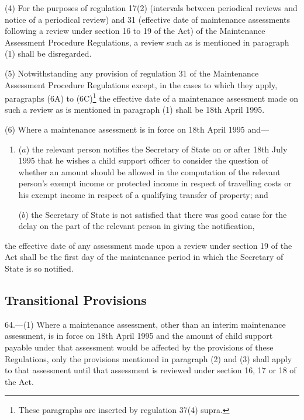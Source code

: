 \documentclass[a4paper]{article}
\begin{document}
(4) For the purposes of regulation 17(2) (intervals between periodical reviews and notice of a periodical review) and 31 (effective date of maintenance assessments following a review under section 16 to 19 of the Act) of the Maintenance Assessment Procedure Regulations, a review such as is mentioned in paragraph (1) shall be disregarded.

(5) Notwithstanding any provision of regulation 31 of the Maintenance Assessment Procedure Regulations except, in the cases to which they apply, paragraphs (6A) to (6C)\footnote{\frenchspacing These paragraphs are inserted by regulation 37(4) supra.} the effective date of a maintenance assessment made on such a review as is mentioned in paragraph (1) shall be 18th April 1995.

(6) Where a maintenance assessment is in force on 18th April 1995 and—
\begin{enumerate}\item[]
($a$) the relevant person notifies the Secretary of State on or after 18th July 1995 that he wishes a child support officer to consider the question of whether an amount should be allowed in the computation of the relevant person’s exempt income or protected income in respect of travelling costs or his exempt income in respect of a qualifying transfer of property; and

($b$) the Secretary of State is not satisfied that there was good cause for the delay on the part of the relevant person in giving the notification,
\end{enumerate}
the effective date of any assessment made upon a review under section 19 of the Act shall be the first day of the maintenance period in which the Secretary of State is so notified.

\subsection[64. Transitional Provisions]{Transitional Provisions}

64.—(1) Where a maintenance assessment, other than an interim maintenance assessment, is in force on 18th April 1995 
and  %
the amount of child support payable under that assessment would be affected by the provisions of these Regulations, only the provisions mentioned in paragraph (2) and (3) shall apply to that assessment until that assessment is reviewed under section 16, 17 or 18 of the Act.
\end{document}
